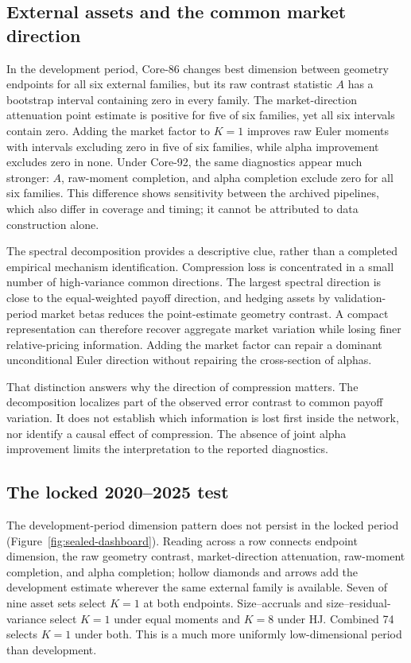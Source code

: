

\subsection{External assets and the common market direction}

In the development period, Core-86 changes best dimension between geometry endpoints for all six external families, but its raw contrast statistic $A$ has a bootstrap interval containing zero in every family. The market-direction attenuation point estimate is positive for five of six families, yet all six intervals contain zero. Adding the market factor to $K=1$ improves raw Euler moments with intervals excluding zero in five of six families, while alpha improvement excludes zero in none. Under Core-92, the same diagnostics appear much stronger: $A$, raw-moment completion, and alpha completion exclude zero for all six families. This difference shows sensitivity between the archived pipelines, which also differ in coverage and timing; it cannot be attributed to data construction alone.

The spectral decomposition provides a descriptive clue, rather than a completed empirical mechanism identification. Compression loss is concentrated in a small number of high-variance common directions. The largest spectral direction is close to the equal-weighted payoff direction, and hedging assets by validation-period market betas reduces the point-estimate geometry contrast. A compact representation can therefore recover aggregate market variation while losing finer relative-pricing information. Adding the market factor can repair a dominant unconditional Euler direction without repairing the cross-section of alphas.

That distinction answers why the direction of compression matters. The decomposition localizes part of the observed error contrast to common payoff variation. It does not establish which information is lost first inside the network, nor identify a causal effect of compression. The absence of joint alpha improvement limits the interpretation to the reported diagnostics.

\subsection{The locked 2020--2025 test}

The development-period dimension pattern does not persist in the locked period (Figure~\ref{fig:sealed-dashboard}). Reading across a row connects endpoint dimension, the raw geometry contrast, market-direction attenuation, raw-moment completion, and alpha completion; hollow diamonds and arrows add the development estimate wherever the same external family is available. Seven of nine asset sets select $K=1$ at both endpoints. Size--accruals and size--residual-variance select $K=1$ under equal moments and $K=8$ under HJ. Combined 74 selects $K=1$ under both. This is a much more uniformly low-dimensional period than development.

